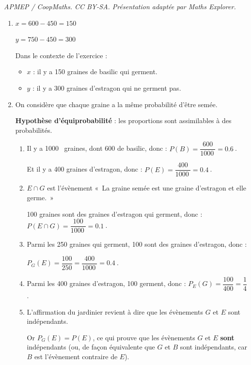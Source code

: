 \documentclass[10pt]{article}
\providecommand{\np}[2][]{{#2~#1}}
\begin{document}
\noindent\textit{APMEP / CoopMaths. CC BY-SA. Présentation adaptée par Maths Explorer.}\par\medskip
\begin{enumerate}
\item $x = 600 - 450 = 150$

$y = 750 - 450 = 300$

Dans le contexte de l'exercice :
\begin{itemize}
	\item $x$ : il y a 150 graines de basilic qui germent.
	\item $y$ : il y a 300 graines d'estragon qui ne germent pas.
\end{itemize}


\item
On considère que chaque graine a la même probabilité d'être semée.

\textbf{Hypothèse d'équiprobabilité} : les proportions sont assimilables à des probabilités.

\begin{enumerate}
	\item Il y a \np{1000} graines, dont 600 de basilic, donc :\quad
	$P(B) = \dfrac{600}{\np{1000}} = \np{0.6}$.

	Et il y a 400 graines d'estragon, donc :\quad
	$P(E) = \dfrac{400}{\np{1000}} = \np{0.4}$.

	\item
$E \cap G$ est l'évènement «~La graine semée est une graine d'estragon et elle germe.~»

	100 graines sont des graines d'estragon qui germent, donc :\quad
	$P(E \cap G) = \dfrac{100}{\np{1000}} = \np{0.1}$.



	\item Parmi les 250 graines qui germent, 100 sont des graines d'estragon, donc :

	$P_{G}(E) = \dfrac{100}{250} = \dfrac{400}{\np{1000}} = \np{0.4}$.

	\item Parmi les 400 graines d'estragon, 100 germent, donc : \quad$P_{E}(G) = \dfrac{100}{400} = \dfrac{1}{4}$.

	\item
	L'affirmation du jardinier revient à dire que les évènements $G$ et $E$ sont indépendants.

	Or $P_{G}(E) = P(E)$, ce qui prouve que les évènements $G$ et $E$ \textbf{sont} indépendants (ou, de façon équivalente que $G$ et $B$ sont indépendants, car $B$ est l'évènement contraire de $E$).
	\end{enumerate}
\end{enumerate}
\end{document}
